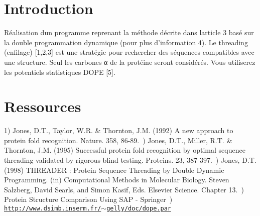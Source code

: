 \hypertarget{index_intro_sec}{}\section{Introduction}\label{index_intro_sec}
Réalisation d\textquotesingle{}un programme reprenant la méthode décrite dans l\textquotesingle{}article 3 basé sur la double programmation dynamique (pour plus d’information 4). Le threading (enfilage) \mbox{[}1,2,3\mbox{]} est une stratégie pour rechercher des séquences compatibles avec une structure. Seul les carbones α de la protéine seront considérés. Vous utiliserez les potentiels statistiques D\+O\+PE \mbox{[}5\mbox{]}. \hypertarget{index_ressources}{}\section{Ressources}\label{index_ressources}
1) Jones, D.\+T., Taylor, W.\+R. \& Thornton, J.\+M. (1992) A new approach to protein fold recognition. Nature. 358, 86-\/89.~) Jones, D.\+T., Miller, R.\+T. \& Thornton, J.\+M. (1995) Successful protein fold recognition by optimal sequence threading validated by rigorous blind testing. Proteins. 23, 387-\/397.~) Jones, D.\+T. (1998) T\+H\+R\+E\+A\+D\+ER \+: Protein Sequence Threading by Double Dynamic Programming. (in) Computational Methods in Molecular Biology. Steven Salzberg, David Searls, and Simon Kasif, Eds. Elsevier Science. Chapter 13.~) Protein Structure Comparison Using S\+AP -\/ Springer~) \href{http://www.dsimb.inserm.fr/~gelly/doc/dope.par}{\tt http\+://www.\+dsimb.\+inserm.\+fr/$\sim$gelly/doc/dope.\+par} 